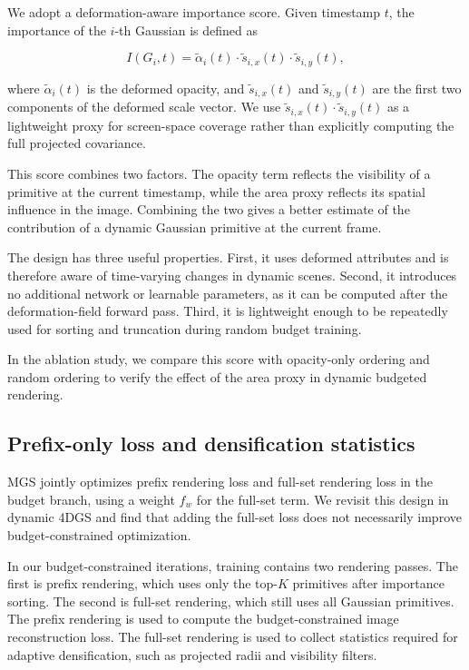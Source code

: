 \documentclass[pdflatex,sn-mathphys]{sn-jnl}
\begin{document}
We adopt a deformation-aware importance score. Given timestamp $t$, the importance of the $i$-th Gaussian is defined as

\begin{equation}
I(G_i,t)
=
\tilde{\alpha}_i(t)
\cdot
\tilde{s}_{i,x}(t)
\cdot
\tilde{s}_{i,y}(t),
\label{eq:importance}
\end{equation}

where $\tilde{\alpha}_i(t)$ is the deformed opacity, and $\tilde{s}_{i,x}(t)$ and $\tilde{s}_{i,y}(t)$ are the first two components of the deformed scale vector. We use $\tilde{s}_{i,x}(t)\cdot\tilde{s}_{i,y}(t)$ as a lightweight proxy for screen-space coverage rather than explicitly computing the full projected covariance.

This score combines two factors. The opacity term reflects the visibility of a primitive at the current timestamp, while the area proxy reflects its spatial influence in the image. Combining the two gives a better estimate of the contribution of a dynamic Gaussian primitive at the current frame.

The design has three useful properties. First, it uses deformed attributes and is therefore aware of time-varying changes in dynamic scenes. Second, it introduces no additional network or learnable parameters, as it can be computed after the deformation-field forward pass. Third, it is lightweight enough to be repeatedly used for sorting and truncation during random budget training.

In the ablation study, we compare this score with opacity-only ordering and random ordering to verify the effect of the area proxy in dynamic budgeted rendering.

\subsection{Prefix-only loss and densification statistics}
\label{sec:loss}

MGS jointly optimizes prefix rendering loss and full-set rendering loss in the budget branch, using a weight $f_w$ for the full-set term. We revisit this design in dynamic 4DGS and find that adding the full-set loss does not necessarily improve budget-constrained optimization.

In our budget-constrained iterations, training contains two rendering passes. The first is prefix rendering, which uses only the top-$K$ primitives after importance sorting. The second is full-set rendering, which still uses all Gaussian primitives. The prefix rendering is used to compute the budget-constrained image reconstruction loss. The full-set rendering is used to collect statistics required for adaptive densification, such as projected radii and visibility filters.
\end{document}
